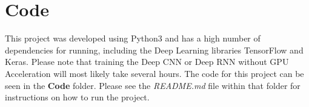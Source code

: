 \documentclass[12pt]{article}
\begin{document}
	\section{Code}
	
	This project was developed using Python3 and has a high number of dependencies for running, including the Deep Learning libraries TensorFlow and Keras. Please note that training the Deep CNN or Deep RNN without GPU Acceleration will most likely take several hours. The code for this project can be seen in the \textbf{Code} folder. Please see the \textit{README.md} file within that folder for instructions on how to run the project.  
	
	
	\newpage
	 
	
\end{document}
